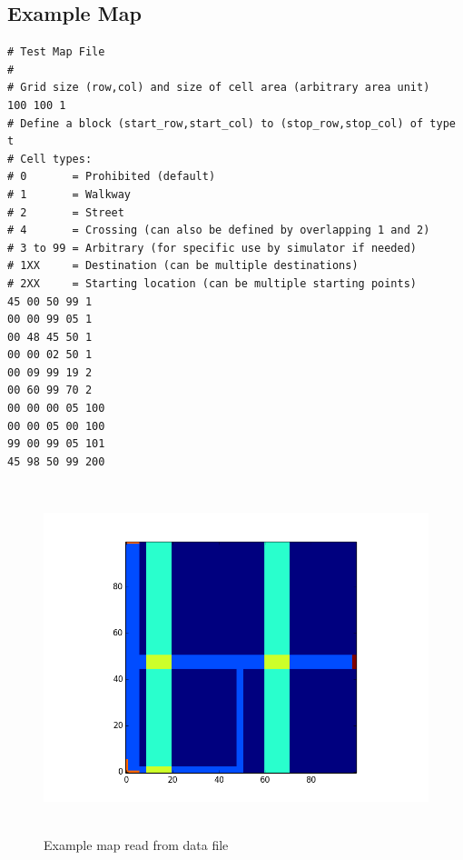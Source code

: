 \documentclass[paper=a4, fontsize=11pt]{scrartcl}
\numberwithin{equation}{section}		%
\numberwithin{figure}{section}			%
\numberwithin{table}{section}		    %
\begin{document}
\begin{appendices}
\subsection{Example Map}
\begin{verbatim}
# Test Map File
#
# Grid size (row,col) and size of cell area (arbitrary area unit)
100 100 1
# Define a block (start_row,start_col) to (stop_row,stop_col) of type t
# Cell types:
# 0       = Prohibited (default)
# 1       = Walkway
# 2       = Street
# 4       = Crossing (can also be defined by overlapping 1 and 2)
# 3 to 99 = Arbitrary (for specific use by simulator if needed)
# 1XX     = Destination (can be multiple destinations)
# 2XX     = Starting location (can be multiple starting points)
45 00 50 99 1
00 00 99 05 1
00 48 45 50 1
00 00 02 50 1
00 09 99 19 2
00 60 99 70 2
00 00 00 05 100
00 00 05 00 100
99 00 99 05 101
45 98 50 99 200
\end{verbatim}

\begin{figure}[H]
	\begin{center} 
		\includegraphics[height=4in,width=5.5in]{map_test_02} 
		\caption{Example map read from data file\label{fig:A:1}} 
	\end{center} 
\end{figure}


\end{appendices}
\end{document}

